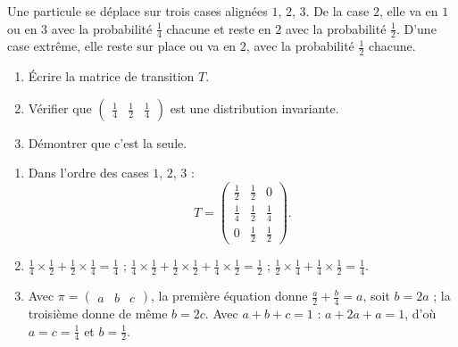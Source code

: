 \begin{exercise}
Une particule se déplace sur trois cases alignées $1$, $2$, $3$. De la case $2$, elle va en $1$ ou en $3$ avec la probabilité $\frac14$ chacune et reste en $2$ avec la probabilité $\frac12$. D'une case extrême, elle reste sur place ou va en $2$, avec la probabilité $\frac12$ chacune.
\begin{enumerate}
\item Écrire la matrice de transition $T$.
\item Vérifier que $\begin{pmatrix}\frac14&\frac12&\frac14\end{pmatrix}$ est une distribution invariante.
\item Démontrer que c'est la seule.
\end{enumerate}
\end{exercise}
\begin{solution}
\begin{enumerate}
\item Dans l'ordre des cases $1$, $2$, $3$ : \[T=\begin{pmatrix}\frac12&\frac12&0\\\frac14&\frac12&\frac14\\0&\frac12&\frac12\end{pmatrix}.\]
\item $\frac14\times\frac12+\frac12\times\frac14=\frac14$ ; $\frac14\times\frac12+\frac12\times\frac12+\frac14\times\frac12=\frac12$ ; $\frac12\times\frac14+\frac14\times\frac12=\frac14$.
\item Avec $\pi=\begin{pmatrix}a&b&c\end{pmatrix}$, la première équation donne $\frac a2+\frac b4=a$, soit $b=2a$ ; la troisième donne de même $b=2c$. Avec $a+b+c=1$ : $a+2a+a=1$, d'où $a=c=\frac14$ et $b=\frac12$.
\end{enumerate}
\end{solution}

